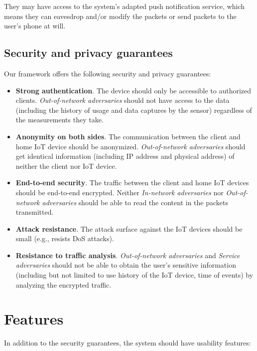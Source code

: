 They may have access to the system's adapted push notification service, which means they can eavesdrop and/or modify the packets or send packets to the user's phone at will.
\subsection{Security and privacy guarantees}

Our framework offers the following security and privacy guarantees:

\begin{itemize}
	\item \textbf{Strong authentication}. The device should only be accessible to authorized clients. \textit{Out-of-network adversaries} should not have access to the data (including the history of usage and data captures by the sensor) regardless of the measurements they take.
	\item \textbf{Anonymity on both sides}. The communication between the client and home IoT device should be anonymized. \textit{Out-of-network adversaries} should get identical information (including IP address and physical address) of neither the client nor IoT device.
	\item \textbf{End-to-end security}. The traffic between the client and home IoT devices should be end-to-end encrypted. Neither \textit{In-network adversaries} nor \textit{Out-of-network adversaries} should be able to read the content in the packets transmitted.
	\item \textbf{Attack resistance}. The attack surface against the IoT devices should be small (e.g., resists DoS attacks).
	\item \textbf{Resistance to traffic analysis}. \textit{Out-of-network adversaries} and \textit{Service adversaries} should not be able to obtain the user's sensitive information (including but not limited to use history of the IoT device, time of events) by analyzing the encrypted traffic.
\end{itemize}

\section{Features}
In addition to the security guarantees, the system should have  usability features:


